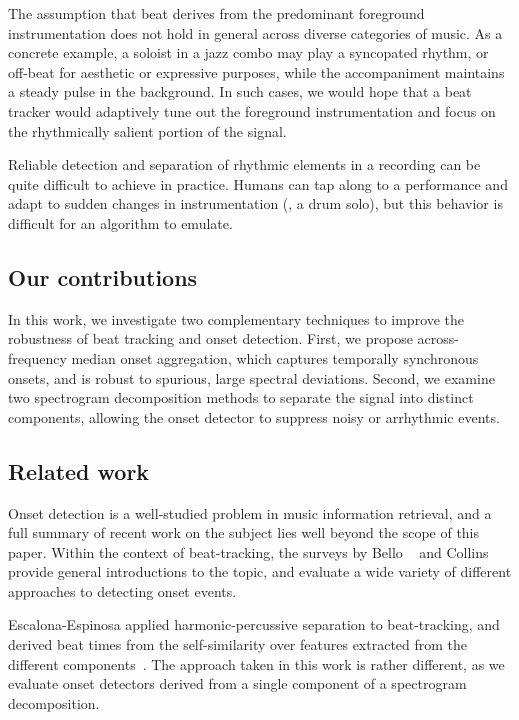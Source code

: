 \documentclass{article}
\begin{document}
The assumption that beat derives from the predominant foreground instrumentation does not 
hold in general across diverse categories of music. As a concrete example, a soloist in a 
jazz combo may play a syncopated rhythm, or off-beat for aesthetic or expressive purposes, 
while the accompaniment maintains a steady pulse in the background.  
In such cases, we would hope that a beat tracker would adaptively tune out the foreground 
instrumentation and focus on the rhythmically salient portion of the signal.

Reliable detection and separation of rhythmic elements in a recording can be quite
difficult to achieve in practice.  Humans can tap along to a
performance and adapt to sudden changes in instrumentation (\eg, a drum solo), but 
this behavior is difficult for an algorithm to emulate.

\subsection{Our contributions}
In this work, we investigate two complementary techniques to improve the robustness of 
beat tracking and onset detection. 
First, we propose across-frequency median onset aggregation, which captures temporally synchronous onsets, and is robust to spurious, large spectral deviations.
Second, we examine two spectrogram decomposition methods to separate the signal into distinct components, allowing the onset detector to suppress noisy or arrhythmic events. 

\subsection{Related work}
\label{sec:related}
Onset detection is a well-studied problem in music information retrieval, and a full
summary of recent work on the subject lies well beyond the scope of this paper.
Within the context of beat-tracking, the surveys by Bello \etal~\cite{bello2005tutorial}
and Collins~\cite{collins2005comparison} provide general introductions to the topic, and
evaluate a wide variety of different approaches to detecting onset events.  

Escalona-Espinosa applied harmonic-percussive separation to beat-tracking, and derived beat 
times from the self-similarity over features extracted from the different 
components~\cite{escalona2008downbeat}.  The approach taken in this work is rather
different, as we evaluate onset detectors derived from a single component of a
spectrogram decomposition.
\end{document}
